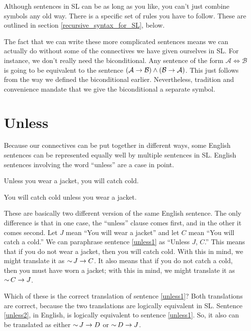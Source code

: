 Although sentences in SL can be as long as you like, you can't just combine symbols any old way. There is a specific set of rules you have to follow. These are outlined in section \ref{recursive_syntax_for_SL}, below.

The fact that we can write these more complicated sentences means we can actually do without some of the connectives we have given ourselves in SL. For instance, we don't really need the biconditional. Any sentence of the form $\mathcal{A} \iff \mathcal{B}$ is going to be equivalent to the sentence $(\mathcal{A} \mathrel{\rightarrow} \mathcal{B}) \land (\mathcal{B} \mathrel{\rightarrow} \mathcal{A})$. This just follows from the way we defined the biconditional earlier. Nevertheless, tradition and convenience mandate that we give the biconditional a separate symbol.

\section{Unless}

Because our connectives can be put together in different ways, some English sentences can be represented equally well by multiple sentences in SL. English sentences involving the word ``unless'' are a case in point.

\begin{kormanize}
\item[\ex{unless1}] Unless you wear a jacket, you will catch cold.
\item[\ex{unless2}] You will catch cold unless you wear a jacket.
\end{kormanize}

These are basically two different version of the same English sentence. The only difference is that in one case, the ``unless'' clause comes first, and in the other it comes second. Let $J$ mean ``You will wear a jacket'' and let $C$ mean ``You will catch a cold.'' We can paraphrase sentence \ref{unless1} as ``Unless $J$, $C$.'' This means that if you do not wear a jacket, then you will catch cold. With this in mind, we might translate it as $\mathop{\sim} J \mathrel{\rightarrow} C$. It also means that if you do not catch a cold, then you must have worn a jacket; with this in mind, we might translate it as $\mathop{\sim} C \mathrel{\rightarrow} J$.

Which of these is the correct translation of sentence \ref{unless1}? Both translations are correct, because the two translations are logically equivalent in SL. Sentence \ref{unless2}, in English, is logically equivalent to sentence \ref{unless1}. So, it also can be translated as either $\mathop{\sim} J \mathrel{\rightarrow} D$ or $\mathop{\sim} D \mathrel{\rightarrow} J$.

